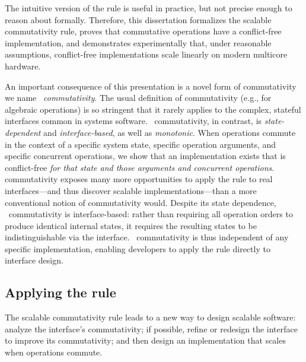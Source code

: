 The intuitive version of the rule is useful in practice, but
not precise enough to reason
about formally.
%
Therefore, this dissertation formalizes the scalable commutativity
rule, proves that commutative operations have a conflict-free
implementation, and demonstrates experimentally that, under reasonable
assumptions, conflict-free implementations scale linearly on modern
multicore hardware.


An important consequence of this presentation is a novel form of
commutativity we name \emph{\SIM\ commutativity}.
%
The usual definition of commutativity (e.g., for algebraic operations)
is so stringent that it rarely applies to the complex, stateful
interfaces common in systems software.
%
\SIM\ commutativity, in contrast, is \emph{state-dependent} and
\emph{interface-based}, as well as \emph{monotonic}.
%
When operations commute in the context of a specific system state,
specific operation arguments, and specific concurrent operations, we
show that an implementation exists that is conflict-free \emph{for that state
  and those arguments and concurrent operations}.
%
\SIM commutativity exposes many more opportunities to apply the rule to real
interfaces---and thus discover scalable implementations---than a more
conventional notion of commutativity would.
%
Despite its state dependence, \SIM\ commutativity is
interface-based: rather than requiring all operation orders to produce
identical internal states, it requires the resulting states to be
indistinguishable via the interface.
%
\SIM\ commutativity is thus independent of any specific
implementation, enabling developers to apply the rule directly to
interface design.


\subsection{Applying the rule}

The scalable commutativity rule leads to a new way to design scalable
software:
%
analyze the interface's commutativity; if possible, refine or redesign
the interface to improve its commutativity; and then design an
implementation that scales when operations commute.

